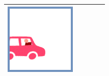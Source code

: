 \documentclass[12pt, a4paper]{article}
\begin{document}
\begin{minipage}{\textwidth}
\begin{table}[H]
\begin{tabulary}{\linewidth}{|C|CCCC|}
				\vspace{0.01cm}\includegraphics[width=\linewidth]{option1}
				\\ \hline
			\end{tabulary}
		\end{table}
	\end{minipage} \\ \\
	
\end{document}
